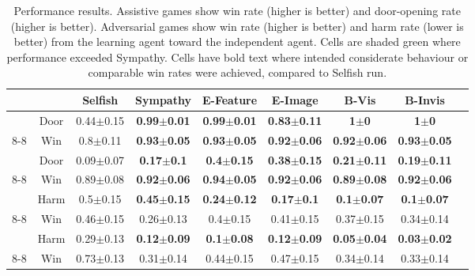 \begin{table*}
\vskip -0.3in
\begin{center}
\caption{Performance results. Assistive games show win rate (higher is better) and door-opening rate (higher is better). Adversarial games show win rate (higher is better) and harm rate (lower is better) from the learning agent toward the independent agent. Cells are shaded green where performance exceeded Sympathy. Cells have bold text where intended considerate behaviour or comparable win rates were achieved, compared to Selfish run.}
\vskip 0.15in
\begin{tabular}{lcccccccl}
\toprule
& & \multicolumn{1}{c}{Selfish} & \multicolumn{1}{c}{Sympathy} & \multicolumn{1}{c}{E-Feature} & \multicolumn{1}{c}{E-Image} & \multicolumn{1}{c}{B-Vis} & \multicolumn{1}{c}{B-Invis} \\ \midrule 
 & Door & 0.44$\pm$0.15 & \textbf{0.99$\pm$0.01} & \cellcolor[HTML]{9AC68B}\textbf{0.99$\pm$0.01} & \textbf{0.83$\pm$0.11} & \cellcolor[HTML]{9AC68B}\textbf{1$\pm$0} & \cellcolor[HTML]{9AC68B}\textbf{1$\pm$0} \\ \cline{8-8} 
\multirow{Ass. 1} & Win & 0.8$\pm$0.11 & \textbf{0.93$\pm$0.05} & \cellcolor[HTML]{9AC68B}\textbf{0.93$\pm$0.05} & \textbf{0.92$\pm$0.06} & \textbf{0.92$\pm$0.06} & \cellcolor[HTML]{9AC68B}\textbf{0.93$\pm$0.05} \\ \midrule 
 & Door & 0.09$\pm$0.07 & \textbf{0.17$\pm$0.1} & \cellcolor[HTML]{9AC68B}\textbf{0.4$\pm$0.15} & \cellcolor[HTML]{9AC68B}\textbf{0.38$\pm$0.15} & \cellcolor[HTML]{9AC68B}\textbf{0.21$\pm$0.11} & \cellcolor[HTML]{9AC68B}\textbf{0.19$\pm$0.11} \\ \cline{8-8} 
\multirow{Ass. 2} & Win & 0.89$\pm$0.08 & \textbf{0.92$\pm$0.06} & \cellcolor[HTML]{9AC68B}\textbf{0.94$\pm$0.05} & \cellcolor[HTML]{9AC68B}\textbf{0.92$\pm$0.06} & \textbf{0.89$\pm$0.08} & \cellcolor[HTML]{9AC68B}\textbf{0.92$\pm$0.06} \\ \midrule  
 & Harm & 0.5$\pm$0.15 & \textbf{0.45$\pm$0.15} & \cellcolor[HTML]{9AC68B}\textbf{0.24$\pm$0.12} & \cellcolor[HTML]{9AC68B}\textbf{0.17$\pm$0.1} & \cellcolor[HTML]{9AC68B}\textbf{0.1$\pm$0.07} & \cellcolor[HTML]{9AC68B}\textbf{0.1$\pm$0.07} \\ \cline{8-8} 
\multirow{Adv. 1} & Win & 0.46$\pm$0.15 & 0.26$\pm$0.13 & \cellcolor[HTML]{9AC68B}0.4$\pm$0.15 & \cellcolor[HTML]{9AC68B}0.41$\pm$0.15 & \cellcolor[HTML]{9AC68B}0.37$\pm$0.15 & \cellcolor[HTML]{9AC68B}0.34$\pm$0.14 \\ \midrule
 & Harm & 0.29$\pm$0.13 & \textbf{0.12$\pm$0.09} & \cellcolor[HTML]{9AC68B}\textbf{0.1$\pm$0.08} & \cellcolor[HTML]{9AC68B}\textbf{0.12$\pm$0.09} & \cellcolor[HTML]{9AC68B}\textbf{0.05$\pm$0.04} & \cellcolor[HTML]{9AC68B}\textbf{0.03$\pm$0.02} \\ \cline{8-8} 
\multirow{Adv. 2} & Win & 0.73$\pm$0.13 & 0.31$\pm$0.14 & \cellcolor[HTML]{9AC68B}0.44$\pm$0.15 & \cellcolor[HTML]{9AC68B}0.47$\pm$0.15 & \cellcolor[HTML]{9AC68B}0.34$\pm$0.14 & \cellcolor[HTML]{9AC68B}0.33$\pm$0.14 \\\midrule
\end{tabular}
\label{table:win_harm_door}
\end{center}
\vskip -0.3in
\end{table*}